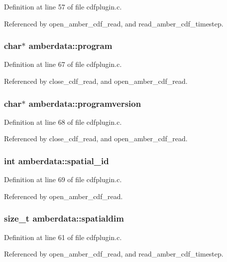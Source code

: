 Definition at line 57 of file cdfplugin.c.

Referenced by open\_\-amber\_\-cdf\_\-read, and read\_\-amber\_\-cdf\_\-timestep.
\subsubsection{\setlength{\rightskip}{0pt plus 5cm}char$\ast$ amberdata::program}\label{structamberdata_m10}




Definition at line 67 of file cdfplugin.c.

Referenced by close\_\-cdf\_\-read, and open\_\-amber\_\-cdf\_\-read.
\subsubsection{\setlength{\rightskip}{0pt plus 5cm}char$\ast$ amberdata::programversion}\label{structamberdata_m11}




Definition at line 68 of file cdfplugin.c.

Referenced by close\_\-cdf\_\-read, and open\_\-amber\_\-cdf\_\-read.
\subsubsection{\setlength{\rightskip}{0pt plus 5cm}int amberdata::spatial\_\-id}\label{structamberdata_m12}




Definition at line 69 of file cdfplugin.c.

Referenced by open\_\-amber\_\-cdf\_\-read.
\subsubsection{\setlength{\rightskip}{0pt plus 5cm}size\_\-t amberdata::spatialdim}\label{structamberdata_m4}




Definition at line 61 of file cdfplugin.c.

Referenced by open\_\-amber\_\-cdf\_\-read, and read\_\-amber\_\-cdf\_\-timestep.
